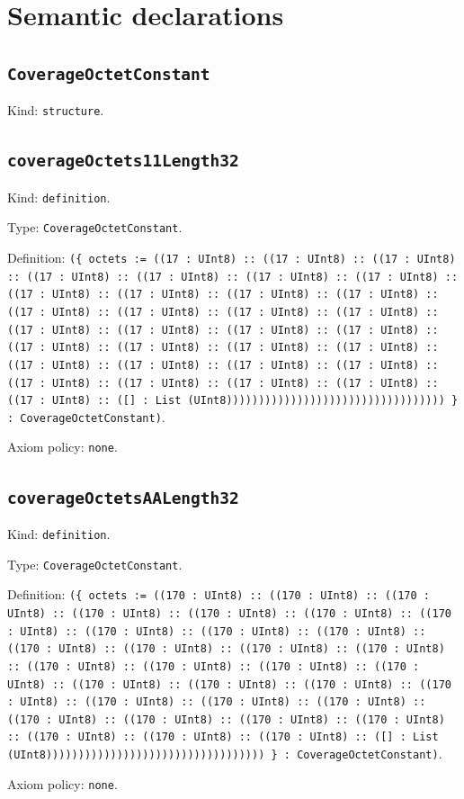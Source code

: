 \documentclass[11pt]{article}
\begin{document}
\section*{Semantic declarations}
\subsection*{\texttt{CoverageOctetConstant}}
\noindent Kind: \texttt{structure}.\par
\subsection*{\texttt{coverageOctets11Length32}}
\noindent Kind: \texttt{definition}.\par
\noindent Type: \texttt{CoverageOctetConstant}.\par
\noindent Definition: \texttt{(\{ octets := ((17 : UInt8) :: ((17 : UInt8) :: ((17 : UInt8) :: ((17 : UInt8) :: ((17 : UInt8) :: ((17 : UInt8) :: ((17 : UInt8) :: ((17 : UInt8) :: ((17 : UInt8) :: ((17 : UInt8) :: ((17 : UInt8) :: ((17 : UInt8) :: ((17 : UInt8) :: ((17 : UInt8) :: ((17 : UInt8) :: ((17 : UInt8) :: ((17 : UInt8) :: ((17 : UInt8) :: ((17 : UInt8) :: ((17 : UInt8) :: ((17 : UInt8) :: ((17 : UInt8) :: ((17 : UInt8) :: ((17 : UInt8) :: ((17 : UInt8) :: ((17 : UInt8) :: ((17 : UInt8) :: ((17 : UInt8) :: ((17 : UInt8) :: ((17 : UInt8) :: ((17 : UInt8) :: ((17 : UInt8) :: ([] : List (UInt8)))))))))))))))))))))))))))))))))) \} : CoverageOctetConstant)}.\par
\noindent Axiom policy: \texttt{none}.\par
\subsection*{\texttt{coverageOctetsAALength32}}
\noindent Kind: \texttt{definition}.\par
\noindent Type: \texttt{CoverageOctetConstant}.\par
\noindent Definition: \texttt{(\{ octets := ((170 : UInt8) :: ((170 : UInt8) :: ((170 : UInt8) :: ((170 : UInt8) :: ((170 : UInt8) :: ((170 : UInt8) :: ((170 : UInt8) :: ((170 : UInt8) :: ((170 : UInt8) :: ((170 : UInt8) :: ((170 : UInt8) :: ((170 : UInt8) :: ((170 : UInt8) :: ((170 : UInt8) :: ((170 : UInt8) :: ((170 : UInt8) :: ((170 : UInt8) :: ((170 : UInt8) :: ((170 : UInt8) :: ((170 : UInt8) :: ((170 : UInt8) :: ((170 : UInt8) :: ((170 : UInt8) :: ((170 : UInt8) :: ((170 : UInt8) :: ((170 : UInt8) :: ((170 : UInt8) :: ((170 : UInt8) :: ((170 : UInt8) :: ((170 : UInt8) :: ((170 : UInt8) :: ((170 : UInt8) :: ([] : List (UInt8)))))))))))))))))))))))))))))))))) \} : CoverageOctetConstant)}.\par
\noindent Axiom policy: \texttt{none}.\par
\end{document}
